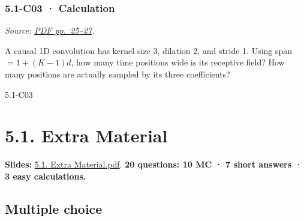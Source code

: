\noindent\begin{minipage}{\linewidth}

\subsubsection{5.1-C03 · Calculation}\label{c03-calculation-12}

\emph{Source:
\href{../Lecture\%20Slides/5.1.\%20Sequence\%20Models.pdf\#page=25}{PDF
pp.~25--27}.}

A causal 1D convolution has kernel size 3, dilation 2, and stride 1.
Using span \(=1+(K-1)d\), how many time positions wide is its receptive
field? How many positions are actually sampled by its three
coefficients?

\begin{solution}[26mm]{5.1-C03}

\end{solution}
\end{minipage}\par\medskip

\clearpage

\section{5.1. Extra Material}\label{extra-material}

\textbf{Slides:}
\href{../Lecture\%20Slides/5.1.\%20Extra\%20Material.pdf}{5.1. Extra
Material.pdf}. \textbf{20 questions: 10 MC · 7 short answers · 3 easy
calculations.}

\subsection{Multiple choice}\label{multiple-choice-13}

